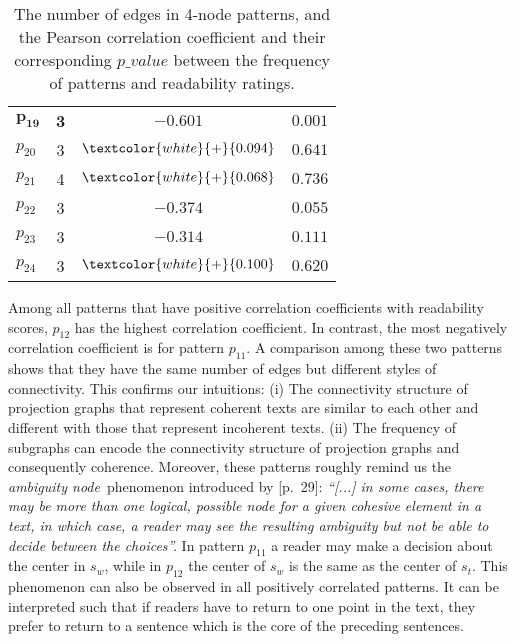 \begin{table}[!ht]
\begin{center}
\begin{tabular}{lccc}
			$\mathbf{p_{19}}$	& \textbf{3} 	  & $\mathbf{-0.601}$ 				& $\mathbf{0.001}$			\\
			$p_{20}$			& 3 			  & $\textcolor{white}{+}{0.094}$   & $0.641$					\\
			$p_{21}$			& 4 			  & $\textcolor{white}{+}{0.068}$	& $0.736$				    \\
			$p_{22}$			& 3				  & $-0.374$ 						& $0.055$					\\
			$p_{23}$			& 3				  & $-0.314$ 						& $0.111$					\\
			$p_{24}$ 			& 3				  & $\textcolor{white}{+}{0.100}$   & $0.620$					\\
			\bottomrule
		\end{tabular}
	\end{center}
	\caption{The number of edges in 4-node patterns, and the Pearson correlation coefficient and their corresponding $p\_value$ between the frequency of patterns and readability ratings.} 
	\label{tab:correlation-4node}
\end{table}

Among all patterns that have positive correlation coefficients with readability scores, $p_{12}$ has the highest correlation coefficient. 
In contrast, the most negatively correlation coefficient is for pattern $p_{11}$. 
A comparison among these two patterns shows that they have the same number of edges but different styles of connectivity.
This confirms our intuitions: (i) The connectivity structure of projection graphs that represent coherent texts are similar to each other and different with those that represent incoherent texts. 
(ii) The frequency of subgraphs can encode the connectivity structure of projection graphs and consequently coherence. 
Moreover, these patterns roughly remind us the \emph{ambiguity node}\ phenomenon introduced by  [p.\ 29]: 
\emph{
	``[...] in some cases, there may be more
	than one logical, possible node for a given cohesive element in a text, in which case, a reader may see the resulting ambiguity but not be able to decide between the choices''.
	}
In pattern $p_{11}$ a reader may make a decision about the center in $s_w$, while in $p_{12}$ the center of $s_w$ is the same as the center of $s_t$. 
This phenomenon can also be observed in all positively correlated patterns.  
It can be interpreted such that if readers have to return to one point in the text, they prefer to return to a sentence which is the core of the preceding sentences.

